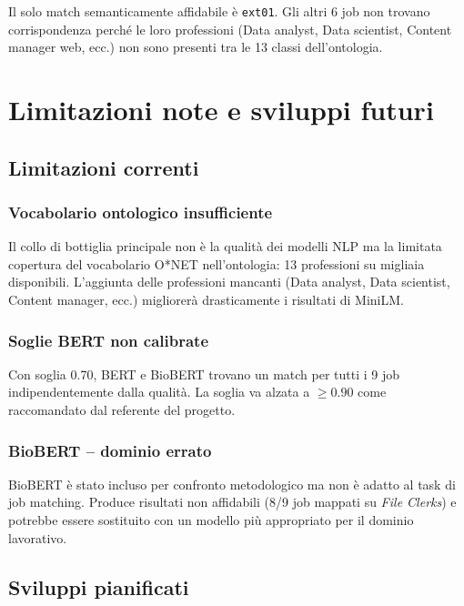 \documentclass[12pt, a4paper]{report}
\begin{document}
Il solo match semanticamente affidabile è \texttt{ext01}. Gli altri
6 job non trovano corrispondenza perché le loro professioni
(Data analyst, Data scientist, Content manager web, ecc.) non sono
presenti tra le 13 classi dell'ontologia.

% 
\chapter{Limitazioni note e sviluppi futuri}
% 

\section{Limitazioni correnti}

\subsection{Vocabolario ontologico insufficiente}

Il collo di bottiglia principale non è la qualità dei modelli NLP ma
la limitata copertura del vocabolario O*NET nell'ontologia: 13
professioni su migliaia disponibili. L'aggiunta delle professioni
mancanti (Data analyst, Data scientist, Content manager, ecc.)
migliorerà drasticamente i risultati di MiniLM.

\subsection{Soglie BERT non calibrate}

Con soglia 0.70, BERT e BioBERT trovano un match per tutti i 9 job
indipendentemente dalla qualità. La soglia va alzata a $\geq 0.90$
come raccomandato dal referente del progetto.

\subsection{BioBERT -- dominio errato}

BioBERT è stato incluso per confronto metodologico ma non è adatto
al task di job matching. Produce risultati non affidabili (8/9 job
mappati su \textit{File Clerks}) e potrebbe essere sostituito con un
modello più appropriato per il dominio lavorativo.

\section{Sviluppi pianificati}
\end{document}
